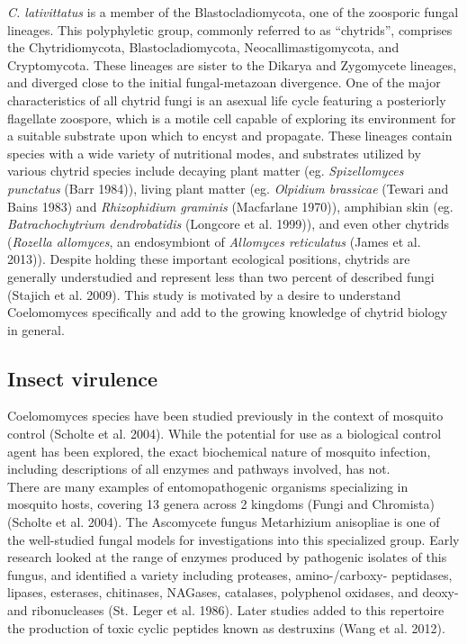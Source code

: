 \indent \textit{C. lativittatus} is a member of the Blastocladiomycota, one of the zoosporic fungal lineages. This polyphyletic group, commonly referred to as “chytrids”, comprises the Chytridiomycota, Blastocladiomycota, Neocallimastigomycota, and Cryptomycota. These lineages are sister to the Dikarya and Zygomycete lineages, and diverged close to the initial fungal-metazoan divergence. One of the major characteristics of all chytrid fungi is an asexual life cycle featuring a posteriorly flagellate zoospore, which is a motile cell capable of exploring its environment for a suitable substrate upon which to encyst and propagate. These lineages contain species with a wide variety of nutritional modes, and substrates utilized by various chytrid species include decaying plant matter (eg. \textit{Spizellomyces punctatus} (Barr 1984)), living plant matter (eg. \textit{Olpidium brassicae} (Tewari and Bains 1983) and \textit{Rhizophidium graminis} (Macfarlane 1970)), amphibian skin (eg. \textit{Batrachochytrium dendrobatidis} (Longcore et al. 1999)), and even other chytrids (\textit{Rozella allomyces}, an endosymbiont of \textit{Allomyces reticulatus} (James et al. 2013)). Despite holding these important ecological positions, chytrids are generally understudied and represent less than two percent of described fungi (Stajich et al. 2009). This study is motivated by a desire to understand Coelomomyces specifically and add to the growing knowledge of chytrid biology in general. \\
\subsection{Insect virulence}
Coelomomyces species have been studied previously in the context of mosquito control (Scholte et al. 2004). While the potential for use as a biological control agent has been explored, the exact biochemical nature of mosquito infection, including descriptions of all enzymes and pathways involved, has not. \\
\indent There are many examples of entomopathogenic organisms specializing in mosquito hosts, covering 13 genera across 2 kingdoms (Fungi and Chromista) (Scholte et al. 2004). The Ascomycete fungus Metarhizium anisopliae is one of the well-studied fungal models for investigations into this specialized group. Early research looked at the range of enzymes produced by pathogenic isolates of this fungus, and identified a variety including proteases, amino-/carboxy- peptidases, lipases, esterases, chitinases, NAGases, catalases, polyphenol oxidases, and deoxy- and ribonucleases (St. Leger et al. 1986). Later studies added to this repertoire the production of toxic cyclic peptides known as destruxins (Wang et al. 2012). \\ 
